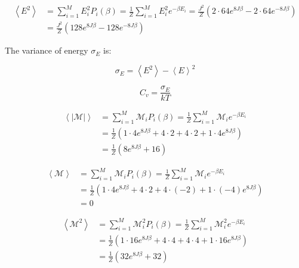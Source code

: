 \documentclass[a4paper, fontsize=11pt]{article}
\begin{document}
\begin{equation}
\begin{split}
\left< E^2 \right> &= \sum_{i=1}^{M} E^2_i P_i (\beta) = \frac{1}{Z} \sum_{i=1}^{M} E^2_i e^{-\beta E_i} = \frac{J^2}{Z} \left(2 \cdot 64e^{8J \beta} - 2 \cdot 64e^{-8J \beta}\right) \\
&= \frac{J^2}{Z} \left(128e^{8J \beta} - 128e^{-8J \beta} \right)
\end{split}
\end{equation}

The variance of energy $\sigma_{E}$ is:

\begin{equation}
\sigma_{E} = \left< E^2 \right> - \left< E \right>^2
\end{equation}

\begin{equation}
C_v = \frac{\sigma_{E}}{kT}
\end{equation}

\begin{equation}
\begin{split}
\left<|\mathcal{M}| \right> &= \sum_{i=1}^{M} \mathcal{M}_i P_i (\beta) = \frac{1}{Z} \sum_{i=1}^{M} \mathcal{M}_i e^{-\beta E_i} \\
&= \frac{1}{Z} \left(1 \cdot 4e^{8J \beta} + 4 \cdot 2 + 4 \cdot 2 + 1 \cdot 4e^{8J \beta} \right) \\
&= \frac{1}{Z} \left(8e^{8J \beta} + 16\right)
\end{split} 
\end{equation}

\begin{equation}
\begin{split}
\left<\mathcal{M} \right> &= \sum_{i=1}^{M} \mathcal{M}_i P_i (\beta) = \frac{1}{Z} \sum_{i=1}^{M} \mathcal{M}_i e^{-\beta E_i} \\
&= \frac{1}{Z} \left(1 \cdot 4e^{8J \beta} + 4 \cdot 2 + 4 \cdot (-2) + 1 \cdot (-4)e^{8J \beta} \right) \\
&= 0
\end{split}
\end{equation}

\begin{equation}
\begin{split}
\left<\mathcal{M}^2 \right> &= \sum_{i=1}^{M} \mathcal{M}^2_i P_i (\beta) = \frac{1}{Z} \sum_{i=1}^{M} \mathcal{M}^2_i e^{-\beta E_i} \\
&= \frac{1}{Z} \left( 1 \cdot 16e^{8J \beta} + 4 \cdot 4 + 4 \cdot 4 + 1 \cdot 16e^{8J \beta} \right) \\
&= \frac{1}{Z} \left(32e^{8J \beta}  + 32\right)
\end{split}
\end{equation}
\end{document}

